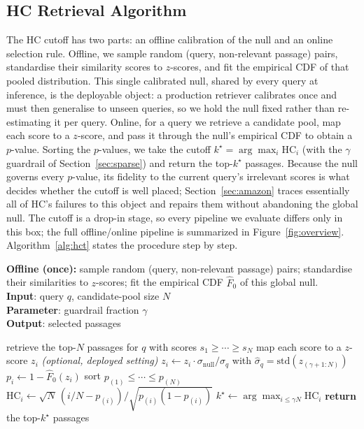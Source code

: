 \documentclass[letterpaper]{article} %
\begin{document}
\subsection{HC Retrieval Algorithm}
The HC cutoff has two parts: an offline calibration of the null and an
online selection rule. Offline, we sample random (query, non-relevant
passage) pairs, standardise their similarity scores to $z$-scores, and
fit the empirical CDF of that pooled distribution. This single calibrated
null, shared by every query at inference, is the deployable object: a
production retriever calibrates once and must then generalise to unseen
queries, so we hold the null fixed rather than re-estimating it per
query. Online, for a query we retrieve a candidate pool, map each score
to a $z$-score, and pass it through the null's empirical CDF to obtain a
$p$-value. Sorting the $p$-values, we take the cutoff
$k^\star = \arg\max_i \mathrm{HC}_i$ (with the $\gamma$ guardrail of
Section~\ref{sec:sparse}) and return the top-$k^\star$ passages. Because
the null governs every $p$-value, its fidelity to the current query's
irrelevant scores is what decides whether the cutoff is well placed;
Section~\ref{sec:amazon} traces essentially all of HC's failures to this
object and repairs them without abandoning the global null. The cutoff is
a drop-in stage, so every pipeline we evaluate differs only in this box;
the full offline/online pipeline is summarized in
Figure~\ref{fig:overview}. Algorithm~\ref{alg:hct} states the procedure
step by step.

\begin{algorithm}[tb]
\caption{HCT-Ret: Higher-Criticism retrieval cutoff}
\label{alg:hct}
\textbf{Offline (once):} sample random (query, non-relevant passage) pairs;
standardise their similarities to $z$-scores; fit the empirical CDF
$\widehat{F}_0$ of this global null.\\
\textbf{Input}: query $q$, candidate-pool size $N$\\
\textbf{Parameter}: guardrail fraction $\gamma$\\
\textbf{Output}: selected passages
\begin{algorithmic}[1]
\STATE retrieve the top-$N$ passages for $q$ with scores $s_1\ge\cdots\ge s_N$
\STATE map each score to a $z$-score $z_i$
\STATE \textit{(optional, deployed setting)}\; $z_i \gets z_i\cdot
\sigma_{\mathrm{null}}/\hat{\sigma}_q$ with $\hat{\sigma}_q=\mathrm{std}\!
\left(z_{(\gamma+1:N)}\right)$ 
\STATE $p_i \gets 1-\widehat{F}_0(z_i)$ 
\STATE sort $p_{(1)}\le\cdots\le p_{(N)}$
\STATE $\mathrm{HC}_i \gets \sqrt{N}\,(i/N-p_{(i)})/\sqrt{p_{(i)}(1-p_{(i)})}$
\ENDFOR
\STATE $k^\star \gets \arg\max_{i\le\gamma N}\mathrm{HC}_i$
\STATE \textbf{return} the top-$k^\star$ passages
\end{algorithmic}
\end{algorithm}
\end{document}
